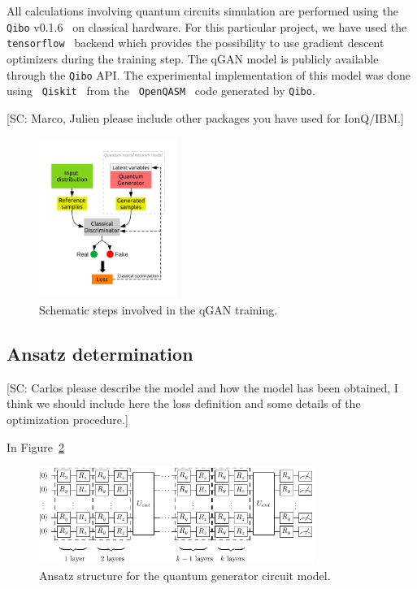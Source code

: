 \documentclass[twocolumn,preprintnumbers,superscriptaddress]{revtex4-2}
\begin{document}
All calculations involving quantum circuits simulation are performed using the
{\tt Qibo} v0.1.6~\cite{efthymiou2020qibo,stavros_efthymiou_2021_5088103} on
classical hardware. For this particular project, we have used the {\tt
tensorflow}~\cite{tensorflow2015-whitepaper} backend which provides the
possibility to use gradient descent optimizers during the training step. The
qGAN model is publicly available through the {\tt Qibo} API. The experimental
implementation of this model was done using {\tt
Qiskit}~\cite{gadi_aleksandrowicz_2019_2562111} from the {\tt
OpenQASM}~\cite{cross2017open} code generated by {\tt Qibo}.

{\color{red}[SC: Marco, Julien please include other packages you have used for IonQ/IBM.]}


\begin{figure}
  \includegraphics[width=0.4\textwidth]{plots/scheme.pdf}
  \caption{\label{fig:scheme} Schematic steps involved in the qGAN training.}
\end{figure}

\subsection{Ansatz determination}

{\color{red}[SC: Carlos please describe the model and how the model has been obtained, I think we should include here the loss definition and some details of the optimization procedure.]}

In Figure~\ref{fig:circuit}

\begin{figure}
  \includegraphics[width=0.8\textwidth]{plots/ansatz1.pdf}
  \caption{\label{fig:circuit}Ansatz structure for the quantum generator circuit model.}
\end{figure}
\end{document}

